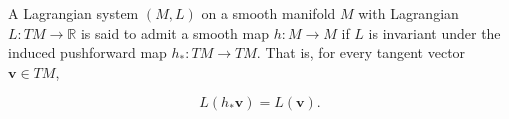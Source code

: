 A Lagrangian system $(M, L)$ on a smooth manifold $M$ with Lagrangian $L: TM \to \mathbb{R}$ is said to admit a smooth map $h: M \to M$ if $L$ is invariant under the induced pushforward map $h_*: TM \to TM$. That is, for every tangent vector $\mathbf{v} \in TM$,

$$L(h_*\mathbf{v}) = L(\mathbf{v}).$$
